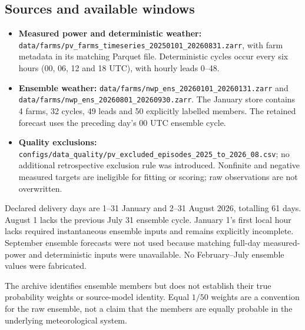 \documentclass[11pt,a4paper]{article}
\newcommand{\code}[1]{\nolinkurl{#1}}
\begin{document}
\subsection{Sources and available windows}
\begin{itemize}
\item \textbf{Measured power and deterministic weather:} \code{data/farms/pv_farms_timeseries_20250101_20260831.zarr}, with farm metadata in its matching Parquet file. Deterministic cycles occur every six hours (00, 06, 12 and 18 UTC), with hourly leads 0--48.
\item \textbf{Ensemble weather:} \code{data/farms/nwp_ens_20260101_20260131.zarr} and \code{data/farms/nwp_ens_20260801_20260930.zarr}. The January store contains 4 farms, 32 cycles, 49 leads and 50 explicitly labelled members. The retained forecast uses the preceding day's 00 UTC ensemble cycle.
\item \textbf{Quality exclusions:} \code{configs/data_quality/pv_excluded_episodes_2025_to_2026_08.csv}; no additional retrospective exclusion rule was introduced. Nonfinite and negative measured targets are ineligible for fitting or scoring; raw observations are not overwritten.
\end{itemize}
Declared delivery days are 1--31 January and 2--31 August 2026, totalling 61 days. August 1 lacks the previous July 31 ensemble cycle. January 1's first local hour lacks required instantaneous ensemble inputs and remains explicitly incomplete. September ensemble forecasts were not used because matching full-day measured-power and deterministic inputs were unavailable. No February--July ensemble values were fabricated.

The archive identifies ensemble members but does not establish their true probability weights or source-model identity. Equal $1/50$ weights are a convention for the raw ensemble, not a claim that the members are equally probable in the underlying meteorological system.
\end{document}
